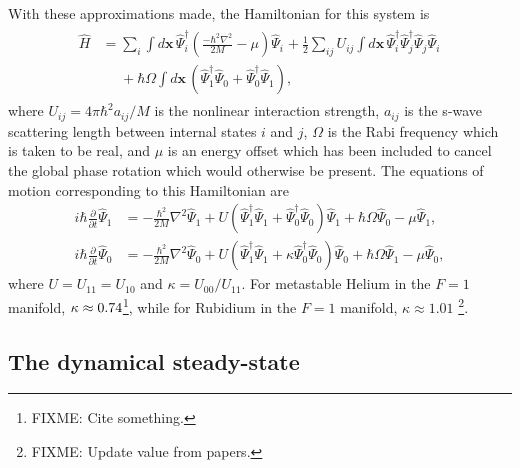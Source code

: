 With these approximations made, the Hamiltonian for this system is
\begin{align}
    \label{Peaks:InitialHamiltonian}
    \begin{split}
    \hat{H} &= \sum_i \int d\bm{x}\, \hat{\Psi}_i^\dagger \left(\frac{-\hbar^2 \nabla^2}{2 M} - \mu\right)\hat{\Psi}_i^{\phantom{\dagger}} + \frac{1}{2} \sum_{i j} U_{i j}\int d\bm{x}\, \hat{\Psi}_i^\dagger \hat{\Psi}_j^\dagger \hat{\Psi}_j^{\phantom{\dagger}} \hat{\Psi}_i^{\phantom{\dagger}}\\
            &\phantom{=} + \hbar \Omega \int d\bm{x}\, \left(\hat{\Psi}_1^\dagger \hat{\Psi}_0^{\phantom{\dagger}} + \hat{\Psi}_0^\dagger \hat{\Psi}_1^{\phantom{\dagger}}\right),
    \end{split}
\end{align}
where $U_{ij} = 4\pi \hbar^2 a_{ij}/M$ is the nonlinear interaction strength, $a_{ij}$ is the s-wave scattering length between internal states $i$ and $j$, $\Omega$ is the Rabi frequency which is taken to be real, and $\mu$ is an energy offset which has been included to cancel the global phase rotation which would otherwise be present. The equations of motion corresponding to this Hamiltonian are
\begin{subequations}
    \label{Peaks:OperatorEquationsOfMotion}
    \begin{align}
    i \hbar \frac{\partial }{\partial t}\hat{\Psi}_1  &= -\frac{\hbar^2}{2M}\nabla^2 \hat{\Psi}_1  + U \left(\hat{\Psi}_1^\dagger \hat{\Psi}_1^{\phantom{\dagger}} + \hat{\Psi}_0^\dagger \hat{\Psi}_0^{\phantom{\dagger}}\right) \hat{\Psi}_1 + \hbar \Omega \hat{\Psi}_0 - \mu \hat{\Psi}_1,  \\
    i \hbar \frac{\partial }{\partial t}\hat{\Psi}_0 &= -\frac{\hbar^2}{2M} \nabla^2 \hat{\Psi}_0 + U \left(\hat{\Psi}_1^\dagger \hat{\Psi}_1^{\phantom{\dagger}} + \kappa \hat{\Psi}_0^\dagger \hat{\Psi}_0^{\phantom{\dagger}} \right) \hat{\Psi}_0 + \hbar \Omega \hat{\Psi}_1 - \mu \hat{\Psi}_0,
    \end{align}
\end{subequations}
where $U=U_{11}=U_{10}$ and $\kappa = U_{00}/U_{11}$. For metastable Helium in the $F=1$ manifold, $\protect{\kappa \approx 0.74}$\footnote{FIXME: Cite something.}, while for Rubidium in the $F=1$ manifold, $\kappa \approx 1.01$ \cite{Kempen:2002,Widera:2006}\footnote{FIXME: Update value from papers.}.

\subsection{The dynamical steady-state}
\label{Peaks:MeanFieldPeriodicity}

